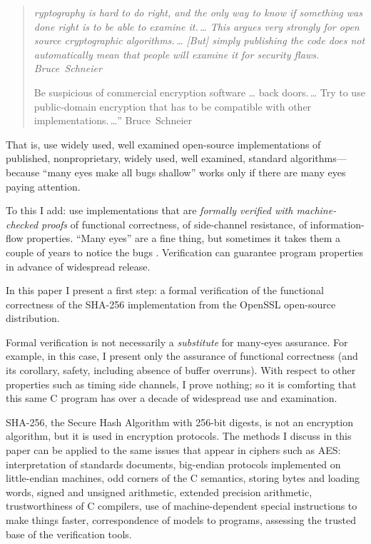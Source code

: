 \documentclass[prodmode,acmtoplas]{acmsmall}
\begin{document}
\begin{quote}
\itshape
\qquad [C]ryptography is hard to do right, and the only way to know if something was done right is to be able to examine it.\,\ldots
This argues very strongly for open source cryptographic algorithms.\,\ldots 
[But] simply publishing the code does not automatically mean that people will examine it for security flaws. \hfill \hbox{Bruce Schneier \citeyear{schneier99:open}}

\qquad Be suspicious of commercial encryption software \ldots 
\linebreak[2] [because of]
back doors.\,\ldots
Try to use public-domain encryption that has to be compatible with
other implementations.\,\ldots'' \hfill \hbox{Bruce Schneier \citeyear{schneier13:how}}
\end{quote}
That is, use widely used, well examined open-source implementations
of published, nonproprietary, widely used, well examined,
standard algorithms---because ``many eyes make all bugs shallow''
works only if there are many eyes paying attention.

To this I add: use implementations that are 
\emph{formally verified with machine-checked proofs}
of functional correctness, of side-channel resistance,
of information-flow properties.
``Many eyes'' are a fine thing, but sometimes it takes
them a couple of years to notice the bugs \cite{heartbleed14}.
Verification can guarantee program properties
in advance of widespread release.

In this paper I present a first step:
a formal verification of the functional
correctness of the SHA-256 implementation
from the OpenSSL open-source distribution.

Formal verification is not necessarily a 
\emph{substitute} for many-eyes assurance.
For example, in this case, I present only 
the assurance of functional correctness
(and its corollary, safety, including
absence of buffer overruns).
With respect to other properties such
as timing side channels, I prove nothing;
so it is comforting that this same C
program has over a decade of widespread
use and examination.

SHA-256, the Secure Hash Algorithm with 256-bit digests,
is not an encryption algorithm, but it is used in
encryption protocols.  The methods I discuss in this
paper can be applied to the same issues that appear
in ciphers such as AES: interpretation of standards
documents, big-endian protocols implemented on little-endian
machines, odd corners of the C semantics, 
storing bytes and loading words,
signed and unsigned arithmetic, 
extended precision arithmetic,
trustworthiness of C compilers, 
use of machine-dependent special instructions to make things faster,
correspondence of models to programs,
assessing the trusted base of the verification tools.
\end{document}

